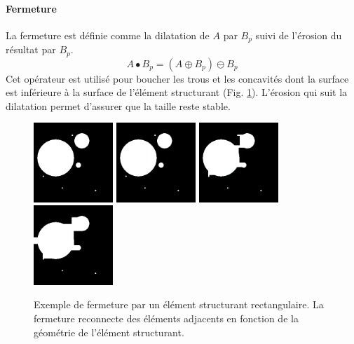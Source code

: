 \paragraph{Fermeture}
La fermeture est définie comme la dilatation de $A$ par $B_p$ suivi de l'érosion du résultat par $B_p$.
\begin{equation}
 A \bullet B_p = (A \oplus B_p) \ominus B_p
\end{equation}  
Cet opérateur est utilisé pour boucher les trous et les concavités dont la surface est inférieure à la surface de l'élément structurant (Fig. \ref{fig:morpho_femerture}). L'érosion qui suit la dilatation permet d'assurer que la taille reste stable.
\begin{figure}[h]
  \centering
  \includegraphics[height=3cm]{Images/morpho_init.png}
  \includegraphics[height=3cm]{Images/morpho_close_k5.png}
  \includegraphics[height=3cm]{Images/morpho_close_k21.png}
  \includegraphics[height=3cm]{Images/morpho_close_k31.png}
  \caption{Exemple de fermeture par un élément structurant rectangulaire. La fermeture reconnecte des éléments adjacents en fonction de la géométrie de l'élément structurant.}
  \label{fig:morpho_femerture}
\end{figure}
